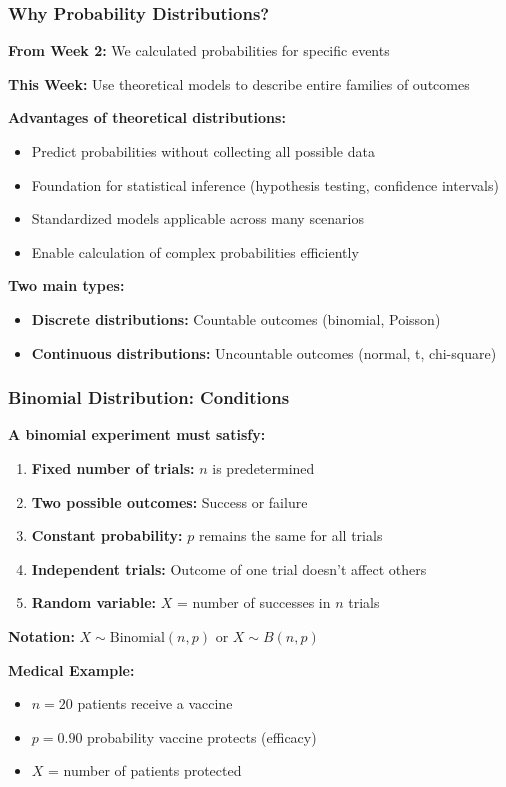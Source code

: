 \documentclass{beamer}
\begin{document}
\begin{frame}
\frametitle{Why Probability Distributions?}
\textbf{From Week 2:} We calculated probabilities for specific events

\vspace{0.5cm}
\textbf{This Week:} Use theoretical models to describe entire families of outcomes

\vspace{0.5cm}
\textbf{Advantages of theoretical distributions:}
\begin{itemize}
\item Predict probabilities without collecting all possible data
\item Foundation for statistical inference (hypothesis testing, confidence intervals)
\item Standardized models applicable across many scenarios
\item Enable calculation of complex probabilities efficiently
\end{itemize}

\vspace{0.5cm}
\textbf{Two main types:}
\begin{itemize}
\item \textbf{Discrete distributions:} Countable outcomes (binomial, Poisson)
\item \textbf{Continuous distributions:} Uncountable outcomes (normal, t, chi-square)
\end{itemize}
\end{frame}

\begin{frame}
\frametitle{Binomial Distribution: Conditions}
\textbf{A binomial experiment must satisfy:}

\begin{enumerate}
\item \textbf{Fixed number of trials:} $n$ is predetermined
\item \textbf{Two possible outcomes:} Success or failure
\item \textbf{Constant probability:} $p$ remains the same for all trials
\item \textbf{Independent trials:} Outcome of one trial doesn't affect others
\item \textbf{Random variable:} $X$ = number of successes in $n$ trials
\end{enumerate}

\vspace{0.5cm}
\textbf{Notation:} $X \sim \text{Binomial}(n, p)$ or $X \sim B(n, p)$

\vspace{0.5cm}
\textbf{Medical Example:}
\begin{itemize}
\item $n = 20$ patients receive a vaccine
\item $p = 0.90$ probability vaccine protects (efficacy)
\item $X$ = number of patients protected
\end{itemize}
\end{frame}
\end{document}
